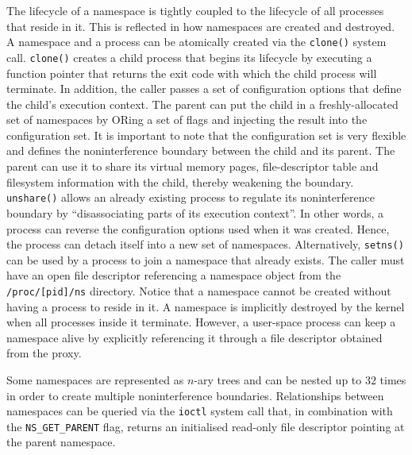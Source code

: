 The lifecycle of a namespace is tightly coupled to the lifecycle of all processes that reside in it. 
This is reflected in how namespaces are created and destroyed. 
A namespace and a process can be atomically created via the \verb|clone()| system call.
\verb|clone()| creates a child process that begins its lifecycle by executing 
a function pointer that returns the exit code with which the child process will terminate.
In addition, the caller passes a set of configuration options that define the child's execution context.
The parent can put the child in a freshly-allocated set of namespaces by ORing a set of flags 
and injecting the result into the configuration set. It is important to note that the 
configuration set is very flexible and defines the noninterference boundary between the child and its parent. 
The parent can use it to share its virtual memory pages, file-descriptor table and filesystem information 
with the child, thereby weakening the boundary. 
\verb|unshare()| allows an already existing process to regulate its noninterference boundary by
\enquote{disassociating parts of its execution context}. In other words, a process can 
reverse the configuration options used when it was created.
Hence, the process can detach itself into a new set of namespaces.
Alternatively, \verb|setns()| can be used by a process to join a namespace that already exists. The caller 
must have an open file descriptor referencing a namespace object from the \verb|/proc/[pid]/ns| directory. 
Notice that a namespace cannot be created without having a process to reside in it. 
A namespace is implicitly 
destroyed by the kernel when all processes inside it terminate. 
However, a user-space process can keep a namespace alive by explicitly referencing it through a 
file descriptor obtained from the proxy.

Some namespaces are represented as $n$-ary trees and can be nested up to $32$ times in order to create multiple 
noninterference boundaries. Relationships between namespaces can be queried via the \verb|ioctl|
system call that, in combination with the \verb|NS_GET_PARENT| flag, returns an initialised read-only file descriptor pointing at 
the parent namespace. 


